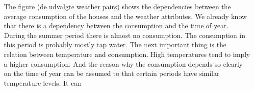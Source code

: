 The figure (de udvalgte weather pairs) shows the dependencies between the average consumption of the houses and the weather attributes.
We already know that there is a dependency between the consumption and the time of year. During the summer period there
is almost no consumption. The consumption in this period is probably mostly tap water. The next important thing is the relation
between temperature and consumption. High temperatures tend to imply a higher consumption. And the reason why the consumption
depends so clearly on the time of year can be assumed to that certain periods have similar temperature levels. 
It can 

